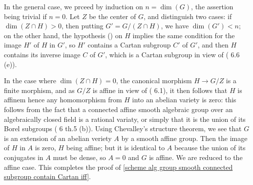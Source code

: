In the general case, we prceed by induction on $n=\dim(G)$, the assertion being trivial if $n=0$. Let $Z$ be the center of $G$, and distinguish two cases: if $\dim(Z\cap H)>0$, then putting $G'=G/(Z\cap H)$, we have $\dim(G')<n$; on the other hand, the hypothesis () on $H$ implies the same condition for the image $H'$ of $H$ in $G'$, so $H'$ contains a Cartan subgroup $C'$ of $G'$, and then $H$ contains its inverse image $C$ of $G'$, which is a Cartan subgroup in view of (\cite{SGA3-2}  6.6 (e)).\par
In the case where $\dim(Z\cap H)=0$, the canonical morphism $H\to G/Z$ is a finite morphism, and as $G/Z$ is affine in view of (\cite{SGA3-2}  6.1), it then follows that $H$ is affinem hence any homomorphism from $H$ into an abelian variety is zero: this follows from the fact that a connected affine smooth algebraic group over an algebraically closed field is a rational variaty, or simply that it is the union of its Borel subgroups (\cite{Chevalley1958} 6 th.5 (b)). Using Chevalley's structure theorem, we see that $G$ is an extension of an abelian veriety $A$ by a smooth affine group. Then the image of $H$ in $A$ is zero, $H$ being affine; but it is identical to $A$ because the union of its conjugates in $A$ must be dense, so $A=0$ and $G$ is affine. We are reduced to the affine case. This completes the proof of \cref{scheme alg group smooth connected subgroup contain Cartan iff}.

